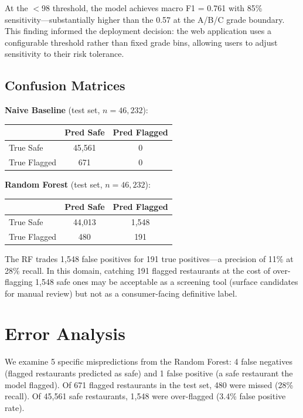 \documentclass{article}
\begin{document}
At the $<$98 threshold, the model achieves macro F1 = 0.761 with 85\% sensitivity---substantially higher than the 0.57 at the A/B/C grade boundary. This finding informed the deployment decision: the web application uses a configurable threshold rather than fixed grade bins, allowing users to adjust sensitivity to their risk tolerance.

\subsection{Confusion Matrices}

\textbf{Naive Baseline} (test set, $n=46{,}232$):

\begin{table}[h]
\centering
\begin{tabular}{lcc}
\toprule
 & \textbf{Pred Safe} & \textbf{Pred Flagged} \\
\midrule
True Safe & 45,561 & 0 \\
True Flagged & 671 & 0 \\
\bottomrule
\end{tabular}
\end{table}

\textbf{Random Forest} (test set, $n=46{,}232$):

\begin{table}[h]
\centering
\begin{tabular}{lcc}
\toprule
 & \textbf{Pred Safe} & \textbf{Pred Flagged} \\
\midrule
True Safe & 44,013 & 1,548 \\
True Flagged & 480 & 191 \\
\bottomrule
\end{tabular}
\end{table}

The RF trades 1,548 false positives for 191 true positives---a precision of 11\% at 28\% recall. In this domain, catching 191 flagged restaurants at the cost of over-flagging 1,548 safe ones may be acceptable as a screening tool (surface candidates for manual review) but not as a consumer-facing definitive label.

\section{Error Analysis}

We examine 5 specific mispredictions from the Random Forest: 4 false negatives (flagged restaurants predicted as safe) and 1 false positive (a safe restaurant the model flagged). Of 671 flagged restaurants in the test set, 480 were missed (28\% recall). Of 45,561 safe restaurants, 1,548 were over-flagged (3.4\% false positive rate).
\end{document}
